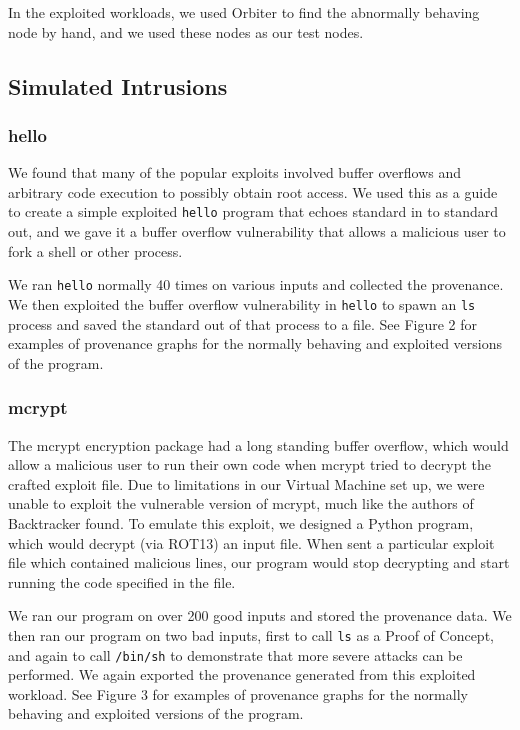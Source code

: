 \documentclass[10pt,twocolumn]{article}
\begin{document}
In the exploited workloads, we used Orbiter \cite{orbiter} to find the abnormally behaving node by hand, and we used these nodes as our test nodes.

\subsection{Simulated Intrusions}

\subsubsection{hello}
We found that many of the popular exploits \cite{metasploit, exploitdb} involved buffer overflows and arbitrary code execution to possibly obtain root access. We used this as a guide to create a simple exploited \texttt{hello} program that echoes standard in to standard out, and we gave it a buffer overflow vulnerability that allows a malicious user to fork a shell or other process.

We ran \texttt{hello} normally 40 times on various inputs and collected the provenance. We then exploited the buffer overflow vulnerability in \texttt{hello} to spawn an \texttt{ls} process and saved the standard out of that process to a file. See Figure 2 for examples of provenance graphs for the normally behaving and exploited versions of the program.

\subsubsection{mcrypt}
The mcrypt encryption package had a long standing buffer overflow, which would allow a malicious user to run their own code when mcrypt tried to decrypt the crafted exploit file. Due to limitations in our Virtual Machine set up, we were unable to exploit the vulnerable version of mcrypt, much like the authors of Backtracker \cite{backtracker} found. To emulate this exploit, we designed a Python program, which would decrypt (via ROT13) an input file. When sent a particular exploit file which contained malicious lines, our program would stop decrypting and start running the code specified in the file.

We ran our program on over 200 good inputs and stored the provenance data. We then ran our program on two bad inputs, first to call \texttt{ls} as a Proof of Concept, and again to call \texttt{/bin/sh} to demonstrate that more severe attacks can be performed. We again exported the provenance generated from this exploited workload. See Figure 3 for examples of provenance graphs for the normally behaving and exploited versions of the program.
\end{document}
